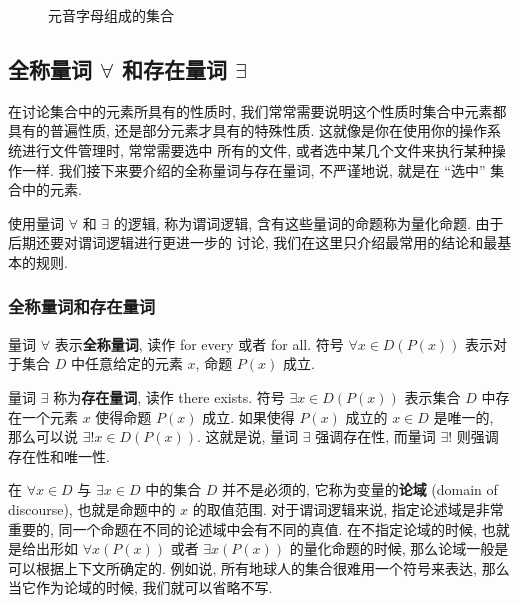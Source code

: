 \documentclass[10pt,UTF8]{book} %
\begin{document}
\begin{figure}[H]

    \caption{元音字母组成的集合}
    \label{元音字母组成的集合}
\end{figure}

\subsection{全称量词 $\forall$ 和存在量词 $\exists$}

在讨论集合中的元素所具有的性质时, 我们常常需要说明这个性质时集合中元素都具有的普遍性质,
还是部分元素才具有的特殊性质. 这就像是你在使用你的操作系统进行文件管理时, 常常需要选中
所有的文件, 或者选中某几个文件来执行某种操作一样. 我们接下来要介绍的全称量词与存在量词,
不严谨地说, 就是在 “选中” 集合中的元素.

使用量词 $\forall$ 和 $\exists$ 的逻辑, 称为谓词逻辑,
含有这些量词的命题称为量化命题.
由于后期还要对谓词逻辑进行更进一步的
讨论, 我们在这里只介绍最常用的结论和最基本的规则.

\subsubsection{全称量词和存在量词}

量词 $\forall$ 表示\textbf{全称量词}, 读作 for every 或者 for all. 符号 $\forall x \in D \left( P(x) \right)$
表示{\kaishu 对于集合 $D$ 中任意给定的元素 $x$, 命题 $P(x)$ 成立}.

量词 $\exists$ 称为\textbf{存在量词}, 读作 there exists. 符号 $\exists x \in D \left( P(x) \right)$
表示{\kaishu 集合 $D$ 中存在一个元素 $x$ 使得命题 $P(x)$ 成立}. 如果使得 $P(x)$ 成立的
$x \in D$ 是唯一的, 那么可以说 $\exists ! x \in D \left( P(x) \right)$.
这就是说, 量词 $\exists$ 强调存在性, 而量词 $\exists!$ 则强调存在性和唯一性.

在 $\forall x \in D$ 与 $\exists x \in D$ 中的集合 $D$ 并不是必须的,
它称为变量的\textbf{论域} (domain of discourse), 也就是命题中的 $x$ 的取值范围.
对于谓词逻辑来说, 指定论述域是非常重要的, 同一个命题在不同的论述域中会有不同的真值.
在不指定论域的时候, 也就是给出形如 $\forall x (P(x))$ 或者 
$\exists x \left(P(x)\right)$ 的量化命题的时候,
那么论域一般是可以根据上下文所确定的. 例如说, 所有地球人的集合很难用一个符号来表达,
那么当它作为论域的时候, 我们就可以省略不写.
\end{document}

